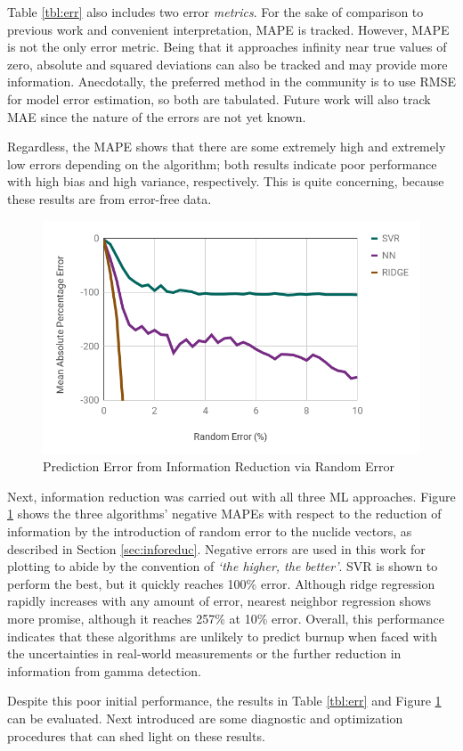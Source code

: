 Table \ref{tbl:err} also includes two error \textit{metrics}.  For the sake of
comparison to previous work and convenient interpretation, \gls{MAPE} is
tracked. However, \gls{MAPE} is not the only error metric. Being that it
approaches infinity near true values of zero, absolute and squared deviations
can also be tracked and may provide more information.  Anecdotally, the
preferred method in the community is to use \gls{RMSE} for model error
estimation, so both are tabulated.  Future work will also track \gls{MAE} since
the nature of the errors are not yet known.  

Regardless, the \gls{MAPE} shows that there are some extremely high and
extremely low errors depending on the algorithm; both results indicate poor
performance with high bias and high variance, respectively.  This is quite
concerning, because these results are from error-free data.

\begin{figure}[!htb]
  \centering
  \includegraphics[width=\linewidth]{./chapters/method/randerr.png}
  \caption{Prediction Error from Information Reduction via Random Error}
  \label{fig:randerr}
\end{figure}

Next, information reduction was carried out with all three \gls{ML} approaches.
Figure \ref{fig:randerr} shows the three algorithms' negative \glspl{MAPE} with
respect to the reduction of information by the introduction of random error to
the nuclide vectors, as described in Section \ref{sec:inforeduc}. Negative
errors are used in this work for plotting to abide by the convention of
\textit{`the higher, the better'}.  \gls{SVR} is shown to perform the best, but
it quickly reaches 100\% error. Although ridge regression rapidly increases
with any amount of error, nearest neighbor regression shows more promise,
although it reaches 257\% at 10\% error.  Overall, this performance indicates
that these algorithms are unlikely to predict burnup when faced with the
uncertainties in real-world measurements or the further reduction in
information from gamma detection.

Despite this poor initial performance, the results in Table \ref{tbl:err} and
Figure \ref{fig:randerr} can be evaluated. Next introduced are some diagnostic
and optimization procedures that can shed light on these results.
